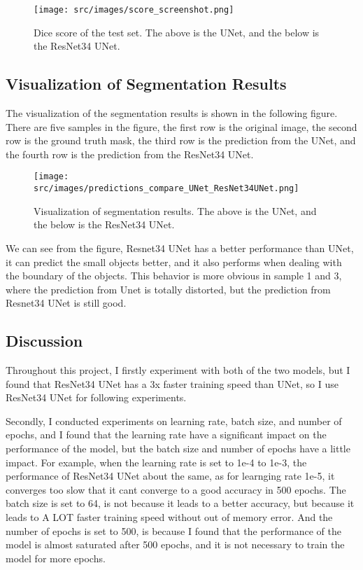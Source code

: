 \begin{figure}[hb]
    \centering
    \texttt{[image: src/images/score\_screenshot.png]}
    \caption{Dice score of the test set. The above is the UNet, and the below is the ResNet34 UNet.}
    \label{fig:test_score_image}
\end{figure}

\subsection{Visualization of Segmentation Results}
The visualization of the segmentation results is shown in the following figure.
There are five samples in the figure, the first row is the original image, the second row is the ground truth mask, the third row is the prediction from the UNet, and the fourth row is the prediction from the ResNet34 UNet.

\begin{figure}[hb]
    \centering
    \texttt{[image: src/images/predictions\_compare\_UNet\_ResNet34UNet.png]}
    \caption{Visualization of segmentation results. The above is the UNet, and the below is the ResNet34 UNet.}
\end{figure}

We can see from the figure, Resnet34 UNet has a better performance than UNet, it can predict the small objects better, and it also performs when dealing with the boundary of the objects. This behavior is more obvious in sample 1 and 3, where the prediction from Unet is totally distorted, but the prediction from Resnet34 UNet is still good.

\subsection{Discussion}
Throughout this project, I firstly experiment with both of the two models, but I found that ResNet34 UNet has a 3x faster training speed than UNet, so I use ResNet34 UNet for following experiments.

Secondly, I conducted experiments on learning rate, batch size, and number of epochs, and I found that the learning rate have a significant impact on the performance of the model, but the batch size and number of epochs have a little impact.
For example, when the learning rate is set to 1e-4 to 1e-3, the performance of ResNet34 UNet about the same, as for learnging rate 1e-5, it converges too slow that it cant converge to a good accuracy in 500 epochs.
The batch size is set to 64, is not because it leads to a better accuracy, but because it leads to A LOT faster training speed without out of memory error. And the number of epochs is set to 500, is because I found that the performance of the model is almost saturated after 500 epochs, and it is not necessary to train the model for more epochs.

